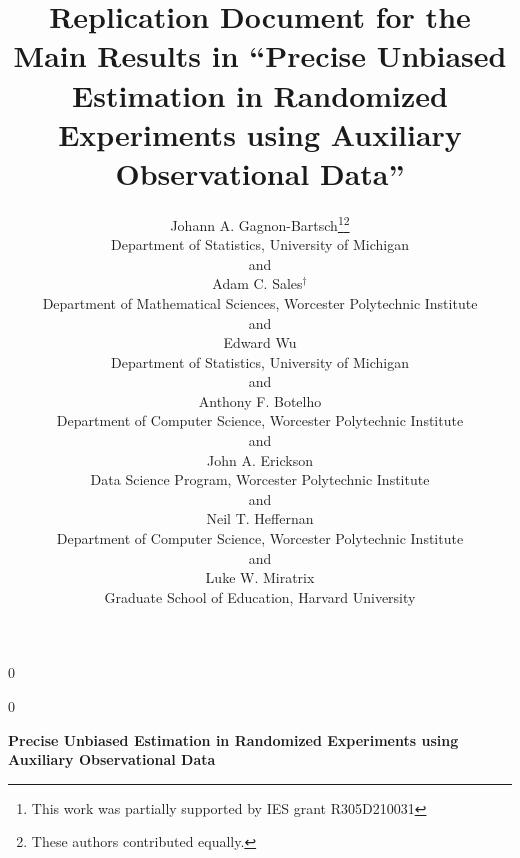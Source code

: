 \documentclass[12pt]{article}\usepackage[]{graphicx}\usepackage[]{color}
\newcommand{\blind}{0}
\begin{document}
%

\def\spacingset#1{\renewcommand{\baselinestretch}%
{#1}\small\normalsize} \spacingset{1}



\blind
{
  \title{\bf Replication Document for the Main Results in ``Precise Unbiased Estimation in Randomized Experiments using Auxiliary Observational Data''}
  \author{Johann A. Gagnon-Bartsch\thanks{This work was partially
      supported by IES grant R305D210031}\hspace{.2cm}\footnote{These authors contributed equally.}\\
    Department of Statistics, University of Michigan\\
    and \\
    Adam C. Sales${}^\dagger$\\
    Department of Mathematical Sciences, Worcester Polytechnic
    Institute\\
        and \\
    Edward Wu \\
    Department of Statistics, University of Michigan\\
    and \\
    Anthony F. Botelho \\
    Department of Computer Science, Worcester Polytechnic
    Institute\\
    and \\
    John A. Erickson \\
    Data Science Program, Worcester Polytechnic
    Institute\\
    and \\
    Neil T. Heffernan \\
    Department of Computer Science, Worcester Polytechnic
    Institute\\
    and \\
    Luke W. Miratrix \\
    Graduate School of Education, Harvard University




  }
  \date{}
  \maketitle
} \fi

\blind
{
  \bigskip
  \bigskip
  \bigskip
  \begin{center}
    \LARGE\bf Precise Unbiased Estimation in Randomized Experiments using Auxiliary Observational Data
\end{center}
  \medskip
} \fi
\end{document}
